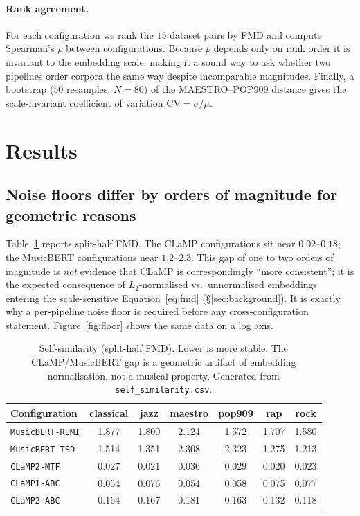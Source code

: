 \documentclass[11pt]{article}
\begin{document}
\paragraph{Rank agreement.}
For each configuration we rank the $15$ dataset pairs by FMD and compute
Spearman's $\rho$ between configurations. Because $\rho$ depends only on
rank order it is invariant to the embedding scale, making it a sound way to
ask whether two pipelines order corpora the same way despite incomparable
magnitudes. Finally, a bootstrap ($50$ resamples, $N=80$) of the
MAESTRO--POP909 distance gives the scale-invariant coefficient of variation
$\mathrm{CV}=\sigma/\mu$.

\section{Results}
\label{sec:results}

\subsection{Noise floors differ by orders of magnitude for geometric reasons}
Table~\ref{tab:selfsim} reports split-half FMD. The CLaMP configurations
sit near $0.02$--$0.18$; the MusicBERT configurations near $1.2$--$2.3$.
This gap of one to two orders of magnitude is \emph{not} evidence that
CLaMP is correspondingly ``more consistent''; it is the expected
consequence of $L_2$-normalised vs.\ unnormalised embeddings entering the
scale-sensitive Equation~\eqref{eq:fmd} (\S\ref{sec:background}). It is
exactly why a per-pipeline noise floor is required before any
cross-configuration statement. Figure~\ref{fig:floor} shows the same data
on a log axis.

\begin{table}[t]
\centering
\caption{Self-similarity (split-half FMD). Lower is more stable. The
CLaMP/MusicBERT gap is a geometric artifact of embedding normalisation, not
a musical property. Generated from \texttt{self\_similarity.csv}.}
\label{tab:selfsim}
\small
\begin{tabular}{@{}lcccccc@{}}
\toprule
Configuration & classical & jazz & maestro & pop909 & rap & rock \\
\midrule
\texttt{MusicBERT-REMI} & 1.877 & 1.800 & 2.124 & 1.572 & 1.707 & 1.580 \\
\texttt{MusicBERT-TSD} & 1.514 & 1.351 & 2.308 & 2.323 & 1.275 & 1.213 \\
\texttt{CLaMP2-MTF} & 0.027 & 0.021 & 0.036 & 0.029 & 0.020 & 0.023 \\
\texttt{CLaMP1-ABC} & 0.054 & 0.076 & 0.054 & 0.058 & 0.075 & 0.077 \\
\texttt{CLaMP2-ABC} & 0.164 & 0.167 & 0.181 & 0.163 & 0.132 & 0.118 \\
\bottomrule
\end{tabular}
\end{table}
\end{document}
